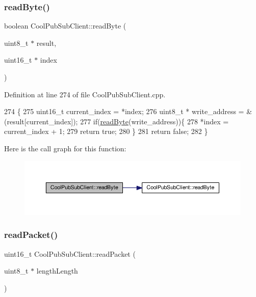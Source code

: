 \subsubsection{\texorpdfstring{read\+Byte()}{readByte()}\hspace{0.1cm}{\footnotesize\ttfamily [2/2]}}
{\footnotesize\ttfamily boolean Cool\+Pub\+Sub\+Client\+::read\+Byte (\begin{DoxyParamCaption}\item[{uint8\+\_\+t $\ast$}]{result,  }\item[{uint16\+\_\+t $\ast$}]{index }\end{DoxyParamCaption})\hspace{0.3cm}{\ttfamily [private]}}



Definition at line 274 of file Cool\+Pub\+Sub\+Client.\+cpp.


\begin{DoxyCode}
274                                                                     \{
275   uint16\_t current\_index = *index;
276   uint8\_t * write\_address = &(result[current\_index]);
277   \textcolor{keywordflow}{if}(\hyperlink{class_cool_pub_sub_client_ad409bbd287d5894f0cf082f62446c002}{readByte}(write\_address))\{
278     *index = current\_index + 1;
279     \textcolor{keywordflow}{return} \textcolor{keyword}{true};
280   \}
281   \textcolor{keywordflow}{return} \textcolor{keyword}{false};
282 \}
\end{DoxyCode}
Here is the call graph for this function\+:\nopagebreak
\begin{figure}[H]
\begin{center}
\leavevmode
\includegraphics[width=350pt]{d8/d4b/class_cool_pub_sub_client_abef3735bb9a2a8c87b3da659dc4ade03_cgraph}
\end{center}
\end{figure}
\mbox{\label{class_cool_pub_sub_client_a25a8779149cfa809b7c06f63568b25cf}} 
\subsubsection{\texorpdfstring{read\+Packet()}{readPacket()}}
{\footnotesize\ttfamily uint16\+\_\+t Cool\+Pub\+Sub\+Client\+::read\+Packet (\begin{DoxyParamCaption}\item[{uint8\+\_\+t $\ast$}]{length\+Length }\end{DoxyParamCaption})\hspace{0.3cm}{\ttfamily [private]}}



